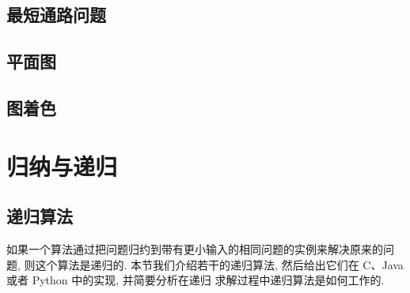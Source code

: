 \documentclass[10pt,UTF8]{book} %
\begin{document}
\section{最短通路问题}
\section{平面图}
\section{图着色}

\newpage
\thispagestyle{empty}

\chapter{归纳与递归}

\section{递归算法}

如果一个算法通过把问题归约到带有更小输入的相同问题的实例来解决原来的问题, 则这个算法是递归的.
本节我们介绍若干的递归算法, 然后给出它们在 C、Java 或者 Python 中的实现, 并简要分析在递归
求解过程中递归算法是如何工作的.
\end{document}

